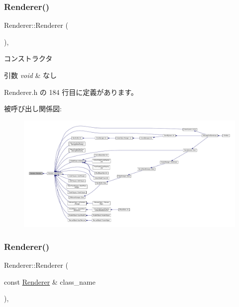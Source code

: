 \subsubsection{\texorpdfstring{Renderer()}{Renderer()}\hspace{0.1cm}{\footnotesize\ttfamily [1/2]}}
{\footnotesize\ttfamily Renderer\+::\+Renderer (\begin{DoxyParamCaption}{ }\end{DoxyParamCaption})\hspace{0.3cm}{\ttfamily [inline]}, {\ttfamily [private]}}



コンストラクタ 


\begin{DoxyParams}{引数}
{\em void} & なし \\
\hline
\end{DoxyParams}


 Renderer.\+h の 184 行目に定義があります。

被呼び出し関係図\+:
\nopagebreak
\begin{figure}[H]
\begin{center}
\leavevmode
\includegraphics[width=350pt]{class_renderer_a7ebf46f54dab9905f79b80f7fddb76a6_icgraph}
\end{center}
\end{figure}
\mbox{\label{class_renderer_a1e7732f4c952f3c13d9bb03a7510b7aa}} 
\subsubsection{\texorpdfstring{Renderer()}{Renderer()}\hspace{0.1cm}{\footnotesize\ttfamily [2/2]}}
{\footnotesize\ttfamily Renderer\+::\+Renderer (\begin{DoxyParamCaption}\item[{const \mbox{\hyperlink{class_renderer}{Renderer}} \&}]{class\+\_\+name }\end{DoxyParamCaption})\hspace{0.3cm}{\ttfamily [private]}, {\ttfamily [delete]}}



